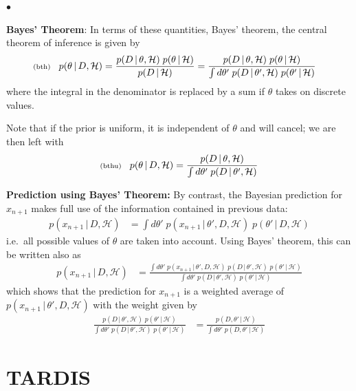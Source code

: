 \documentclass[11pt]{article}
\newcommand{\lleq}[1]{\label{#1} }
\renewcommand{\lleq}[1]{\label{#1} {\scriptstyle {\rm (#1)}} \hspace*{2ex} }
\newenvironment{mtemize}{
  \begin{list}{$\bullet$}
    {\setlength{\itemsep}{0pt}
     \setlength{\leftmargin}{3ex}
    }
  }
  {\end{list}}
\newcommand{\hmod}  {{\mathcal{H}}}  %
\newcommand{\cond}{\,|\,}
\begin{document}
\begin{mtemize}
\item \textbf{Bayes' Theorem}: In terms of these quantities, Bayes'
  theorem, the central theorem of inference is given by
  \begin{align}
    \lleq{bth}
    p(\theta\cond D,\hmod)
    &= \frac{p(D\cond\theta,\hmod)\;p(\theta\cond\hmod)}
    {p(D\cond\hmod)}
    = \frac{p(D\cond\theta,\hmod)\;p(\theta\cond\hmod)}
    {\int d\theta'\; p(D\cond\theta',\hmod)\;p(\theta'\cond\hmod)}
  \end{align}
  where the integral in the denominator is replaced by a sum if
  $\theta$ takes on discrete values.

\item Note that if the prior is uniform, it is independent of $\theta$
  and will cancel; we are then left with
  \begin{equation}
    \lleq{bthu}
    p(\theta\cond D,\hmod)
    = \frac{p(D\cond\theta,\hmod)} {\int d\theta'\; p(D\cond\theta',\hmod)}
  \end{equation}

\item \textbf{Prediction using Bayes' Theorem:} By contrast, the
  Bayesian prediction for $x_{n+1}$ makes full use of the information
  contained in previous data:
  \begin{align}
    p(x_{n+1}\cond D,\hmod)
    &= \int d\theta'\; p(x_{n+1}\cond\theta',D,\hmod)\;p(\theta'\cond
    D,\hmod)
  \end{align}
  i.e.\ all possible values of $\theta$ are taken into account. Using
  Bayes' theorem, this can be written also as
  \begin{align}
    p(x_{n+1}\cond D,\hmod)
    &= \frac{\int d\theta'\; p(x_{n+1}\cond\theta',D,\hmod)\;
      p(D\cond\theta',\hmod)\;p(\theta'\cond\hmod)}
    {\int d\theta'\; p(D\cond\theta',\hmod)\;p(\theta'\cond\hmod)}
  \end{align}
  which shows that the prediction for $x_{n+1}$ is a weighted average
  of $p(x_{n+1}\cond\theta',D,\hmod)$ with the weight given by
  \begin{align}
  \frac{p(D\cond\theta',\hmod)\;p(\theta'\cond\hmod)}
  {\int d\theta'\; p(D\cond\theta',\hmod)\;p(\theta'\cond\hmod)}
  &=
  \frac{p(D,\theta'\cond\hmod)}
  {\int d\theta'\; p(D,\theta'\cond\hmod)}
  \end{align}
\end{mtemize}

\section{TARDIS}
\end{document}
